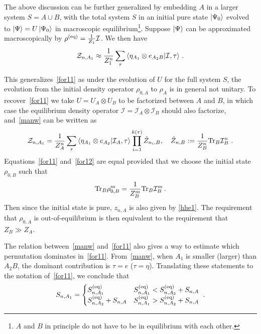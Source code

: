 \documentclass[a4paper,11pt]{article}
\newcommand*{\JKF}[1]{\textcolor{blue}{#1}}
\newcommand{\SV}[1]{\textcolor{red}{#1}}
\newcommand\vev[1]{{\ensuremath{\left\langle{#1}\right\rangle}}}
\newcommand{\be}{\begin{equation}}
\newcommand{\ee}{\end{equation}}
\newcommand{\bca}{\begin{cases}}
\newcommand{\eca}{\end{cases}}
\newcommand\ov{\over}
\newcommand\sI{{\ensuremath{{\mathcal I}}}}
\newcommand\sZ{{\mathcal Z}}
\newcommand{\Tr}{\text{Tr}}
\begin{document}
The above discussion can be further generalized by embedding $A$ in a larger 
system $S = A \cup B$, with the total system $S$ in an initial pure state $\ket{\Psi_0}$ evolved to $\ket{\Psi}
= U \ket{\Psi_0}$ in macroscopic equilibrium\footnote{$A$ and $B$ in principle do not have to be in equilibrium with each other.}. %
Suppose $\ket{\Psi}$ can be approximated macroscopically by $\rho^{(\rm eq)} = {1 \ov Z_1} \sI$. 
We then have 
\be \label{manw}
\sZ_{n, A_1} \approx {1 \ov Z_1^n} \sum_{\tau} \vev{\eta_{A_1} \otimes e_{A_2 B} | \sI , \tau} \ .
\ee


This generalizes~\eqref{for11} as under the evolution of $U$ for the full system $S$, the evolution from the initial density operator $\rho_{0,A}$ to $\rho_A$ is in general not unitary. To recover~\eqref{for11} we take 
$ U = U_A \otimes U_B$ to be factorized between $A$ and $B$, in which case 
the equilibrium density operator $\sI = \sI_A \otimes \sI_B$ should also factorize, and~\eqref{manw} can be written as 
\be \label{for12} 
\sZ_{n, A_1} = {1 \ov Z_A^n} \sum_{\tau} \vev{\eta_{A_1} \otimes e_{A_2} | \sI_A , \tau} \prod_{i=1}^{k (\tau)} \hat Z_{n_i, B} , \quad 
\hat Z_{n, B} := {1 \ov Z_B^n} {\rm \Tr}_B \sI_B^n \ .
\ee
Equations~\eqref{for11} and~\eqref{for12} are equal provided that we choose the initial state $\rho_{0,B}$ such that 
\be \label{hhe1}
 {\rm Tr}_B \rho_{0, B}^m = {1 \ov Z_B^m} {\rm Tr}_B \sI_B^m \, . 
 \ee
Then since the initial state is pure, $z_{n, A}$ is also given by \eqref{hhe1}. The requirement that $\rho_{0, A}$ is out-of-equilibrium is then equivalent to the requirement that $Z_{B} \gg Z_{A}$.

The relation between~\eqref{manw} and~\eqref{for11} also gives a way to estimate which permutation dominates in~\eqref{for11}. 
From~\eqref{manw}, when $A_1$ is smaller (larger) than $A_2 B$, the dominant contribution is $\tau = e$ ($\tau = \eta$). Translating these statements to the notation of~\eqref{for11}, we conclude that 
\be \label{ejjj}
S_{n, A_1} = \bca S_{n, A_1}^{({\rm eq})} & S_{n, A_1}^{(\rm eq)} < S_{n, A_2}^{(\rm eq)} + S_{n,A} \cr
 S_{n, A_2}^{({\rm eq})} + S_{n,A} & S_{n, A_1}^{(\rm eq)} > S_{n, A_2}^{(\rm eq)} + S_{n,A} 
 \eca \ .
\ee 
\end{document}
